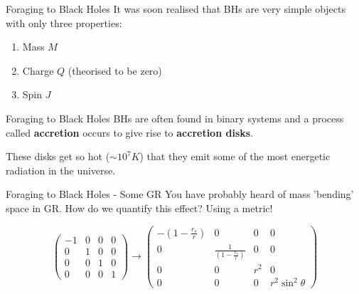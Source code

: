 \documentclass{beamer}
\begin{document}
\begin{frame}{Foraging to Black Holes}
    It was soon realised that BHs are very simple objects with only three properties:

    \vspace{0.5cm}

    \begin{enumerate}
        \item Mass $M$
        \item Charge $Q$ (theorised to be zero)
        \item Spin $J$
    \end{enumerate}
\end{frame}


\begin{frame}{Foraging to Black Holes}
    BHs are often found in binary systems and a process called \textbf{accretion} occurs to give rise to \textbf{accretion disks}.

    \vspace{0.5cm}

    These disks get so hot ($\sim 10^{7}K$) that they emit some of the most energetic radiation in the universe.
\end{frame}


\begin{frame}{Foraging to Black Holes - Some GR}
    You have probably heard of mass 'bending' space in GR. How do we quantify this effect? Using a metric!

    \vspace{0.5cm}

    \begin{equation*}
        \begin{pmatrix} -1 & 0 & 0 & 0 \\ 0 & 1 & 0 & 0 \\ 0 & 0 & 1 & 0 \\ 0 & 0 & 0 & 1 \end{pmatrix} \to \begin{pmatrix} -\left( 1 - \frac{r_{s}}{r} \right) & 0 & 0 & 0 \\ 0 & \frac{1}{\left( 1 - \frac{r_{s}}{r} \right)} & 0 & 0 \\ 0 & 0 & r^{2} & 0 \\ 0 & 0 & 0 & r^{2}\sin^{2}{\theta} \end{pmatrix}
    \end{equation*}
\end{frame}
\end{document}
